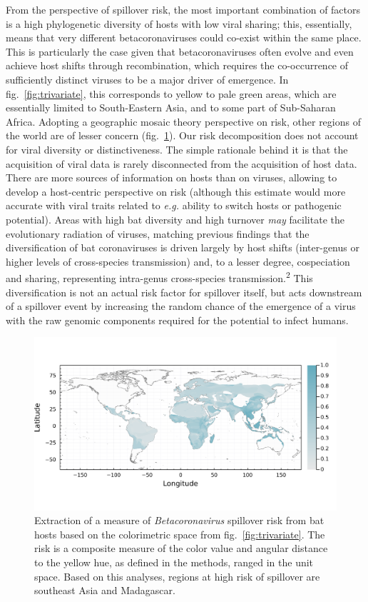 \documentclass[10pt,oneside]{article}
\makeatletter
\def\maxwidth{\ifdim\Gin@nat@width>\linewidth\linewidth
\else\Gin@nat@width\fi}
\let\Oldincludegraphics\includegraphics
\renewcommand{\includegraphics}[1]{\Oldincludegraphics[width=\maxwidth]{#1}}
\makeatother
\begin{document}
From the perspective of spillover risk, the most important combination
of factors is a high phylogenetic diversity of hosts with low viral
sharing; this, essentially, means that very different betacoronaviruses
could co-exist within the same place. This is particularly the case
given that betacoronaviruses often evolve and even achieve host shifts
through recombination, which requires the co-occurrence of sufficiently
distinct viruses to be a major driver of emergence. In
fig.~\ref{fig:trivariate}, this corresponds to yellow to pale green
areas, which are essentially limited to South-Eastern Asia, and to some
part of Sub-Saharan Africa. Adopting a geographic mosaic theory
perspective on risk, other regions of the world are of lesser concern
(fig.~\ref{fig:risk}). Our risk decomposition does not account for viral
diversity or distinctiveness. The simple rationale behind it is that the
acquisition of viral data is rarely disconnected from the acquisition of
host data. There are more sources of information on hosts than on
viruses, allowing to develop a host-centric perspective on risk
(although this estimate would more accurate with viral traits related to
\emph{e.g.} ability to switch hosts or pathogenic potential). Areas with
high bat diversity and high turnover \emph{may} facilitate the
evolutionary radiation of viruses, matching previous findings that the
diversification of bat coronaviruses is driven largely by host shifts
(inter-genus or higher levels of cross-species transmission) and, to a
lesser degree, cospeciation and sharing, representing intra-genus
cross-species transmission.\textsuperscript{2} This diversification is
not an actual risk factor for spillover itself, but acts downstream of a
spillover event by increasing the random chance of the emergence of a
virus with the raw genomic components required for the potential to
infect humans.

\begin{figure}
\hypertarget{fig:risk}{%
\centering
\includegraphics{figures/risk_map.png}
\caption{Extraction of a measure of \emph{Betacoronavirus} spillover
risk from bat hosts based on the colorimetric space from
fig.~\ref{fig:trivariate}. The risk is a composite measure of the color
value and angular distance to the yellow hue, as defined in the methods,
ranged in the unit space. Based on this analyses, regions at high risk
of spillover are southeast Asia and Madagascar.}\label{fig:risk}
}
\end{figure}
\end{document}
